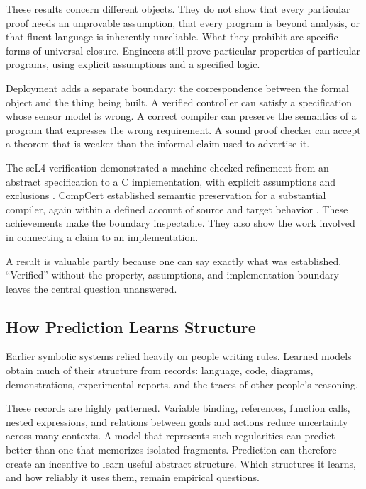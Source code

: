 These results concern different objects. They do not show that every particular proof needs an unprovable assumption, that every program is beyond analysis, or that fluent language is inherently unreliable. What they prohibit are specific forms of universal closure. Engineers still prove particular properties of particular programs, using explicit assumptions and a specified logic.

Deployment adds a separate boundary: the correspondence between the formal object and the thing being built. A verified controller can satisfy a specification whose sensor model is wrong. A correct compiler can preserve the semantics of a program that expresses the wrong requirement. A sound proof checker can accept a theorem that is weaker than the informal claim used to advertise it.

The seL4 verification demonstrated a machine-checked refinement from an abstract specification to a C implementation, with explicit assumptions and exclusions \cite{klein2009sel4}. CompCert established semantic preservation for a substantial compiler, again within a defined account of source and target behavior \cite{leroy2009compcert}. These achievements make the boundary inspectable. They also show the work involved in connecting a claim to an implementation.

A result is valuable partly because one can say exactly what was established. “Verified” without the property, assumptions, and implementation boundary leaves the central question unanswered.

\subsection{How Prediction Learns Structure}

Earlier symbolic systems relied heavily on people writing rules. Learned models obtain much of their structure from records: language, code, diagrams, demonstrations, experimental reports, and the traces of other people's reasoning.

These records are highly patterned. Variable binding, references, function calls, nested expressions, and relations between goals and actions reduce uncertainty across many contexts. A model that represents such regularities can predict better than one that memorizes isolated fragments. Prediction can therefore create an incentive to learn useful abstract structure. Which structures it learns, and how reliably it uses them, remain empirical questions.

